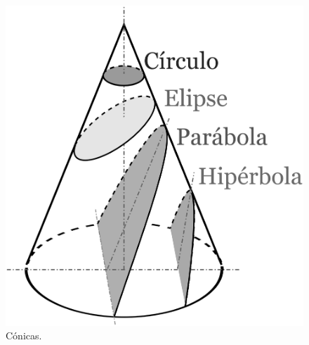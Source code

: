 \begin{figure}[h]
   \centering
   \includegraphics[scale=0.05]{images/conicas}
   \caption{Cónicas.}
   \label{fig:conicas}
\end{figure}

